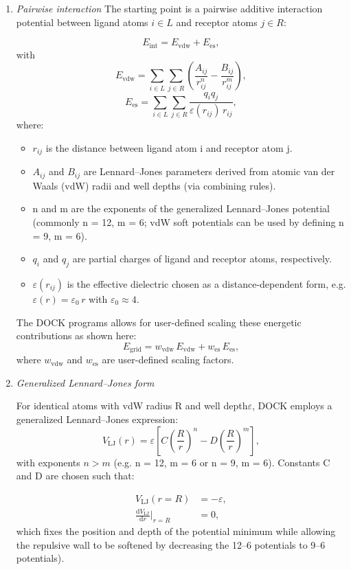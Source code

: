 \documentclass[12pt, a4paper]{article}
\begin{document}
\begin{enumerate}
\item \textit{Pairwise interaction}
The starting point is a pairwise additive interaction potential between ligand atoms $i \in L$ and receptor atoms
$j \in R$:

\[
  E_{\text{int}} = E_{\text{vdw}} + E_{\text{es}},
\]
with
\[
  E_{\text{vdw}} =
    \sum_{i \in L} \sum_{j \in R}
    \left(
      \frac{A_{ij}}{r_{ij}^{n}} -
      \frac{B_{ij}}{r_{ij}^{m}}
    \right),
\]
\[
  E_{\text{es}} =
    \sum_{i \in L} \sum_{j \in R}
    \frac{q_i q_j}{\varepsilon(r_{ij})\, r_{ij}},
\]
where:
\begin{itemize}
  \item $r_{ij}$ is the distance between ligand atom i and receptor atom j.
  \item $A_{ij}$ and $B_{ij}$ are Lennard--Jones parameters derived from atomic van der Waals (vdW) radii and well depths
        (via combining rules).
  \item n and m are the exponents of the generalized Lennard--Jones potential (commonly n = 12, m = 6; vdW soft potentials can be used by defining n = 9, m = 6).
  \item $q_i$ and $q_j$ are partial charges of ligand and receptor atoms, respectively.
  \item \(\varepsilon(r_{ij})\) is the effective dielectric chosen as a distance-dependent form, e.g.
        \(\varepsilon(r) = \varepsilon_0\, r\) with
        \(\varepsilon_0 \approx 4\).
\end{itemize}

The DOCK programs allows for user-defined scaling these  energetic contributions as shown here:
\[
  E_{\text{grid}} =
    w_{\text{vdw}}\, E_{\text{vdw}} +
    w_{\text{es}}\, E_{\text{es}},
\]
where $w_{\text{vdw}}$ and $w_{\text{es}}$ are user-defined scaling factors.

\item \textit{Generalized Lennard--Jones form}

For identical atoms with vdW radius R and well depth\(\varepsilon\), DOCK employs a generalized Lennard--Jones expression:
 \[
  V_{\text{LJ}}(r) = \varepsilon
    \left[
      C \left( \frac{R}{r} \right)^{n}
      -
      D \left( \frac{R}{r} \right)^{m}
    \right],
\]
with exponents $n > m$ (e.g. n = 12, m = 6 or n = 9, m = 6).  Constants C and D are chosen such that:

\begin{align*}
  V_{\text{LJ}}(r = R) &= -\varepsilon, \\
  \frac{\mathrm{d} V_{\text{LJ}}}{\mathrm{d}r}\biggr|_{r = R} &= 0,
\end{align*}
which fixes the position and depth of the potential minimum while allowing the repulsive wall to be softened by decreasing the 12--6 potentials to 9--6 potentials).


\end{enumerate}
\end{document}

